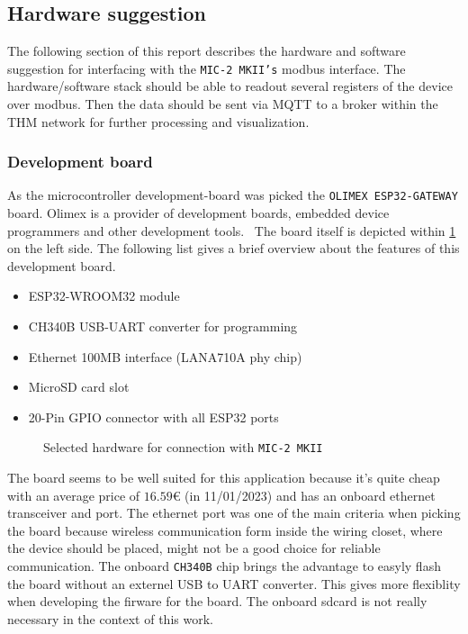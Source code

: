 \subsection{Hardware suggestion}
\label{sec:hardware-suggestion}
	The following section of this report describes the hardware and software suggestion for interfacing with the \texttt{MIC-2 MKII's} modbus interface. The hardware/software stack should be able to readout several registers of the device over modbus. Then the data should be sent via \ac{MQTT} to a broker within the THM network for further processing and visualization.

	\subsubsection{Development board}
		As the microcontroller development-board was picked the \texttt{OLIMEX ESP32-GATEWAY} board. Olimex is a provider of development boards, embedded device programmers and other development tools.~\cite{olimex}
		The board itself is depicted within \cref{subfig:hw-components} on the left side. The following list gives a brief overview about the features of this development board.
		\begin{itemize}
			\item ESP32-WROOM32 module
			\item CH340B USB-UART converter for programming
			\item Ethernet 100MB interface (LANA710A phy chip)
			\item MicroSD card slot
			\item 20-Pin GPIO connector with all ESP32 ports
		\end{itemize}
		\begin{figure}[H]
			\qquad
			\caption{Selected hardware for connection with \texttt{MIC-2 MKII}}
			\label{subfig:hw-components}
		\end{figure}
			The board seems to be well suited for this application because it's quite cheap with an average price of $ 16.59 € $ (in 11/01/2023) and has an onboard ethernet transceiver and port. The ethernet port was one of the main criteria when picking the board because wireless communication form inside the wiring closet, where the device should be placed, might not be a good choice for reliable communication. The onboard \texttt{CH340B} chip brings the advantage to easyly flash the board without an externel \ac{USB} to \ac{UART} converter. This gives more flexiblity when developing the firware for the board. The onboard sdcard is not really necessary in the context of this work.\\ %
